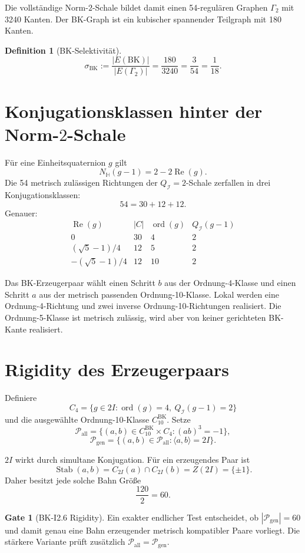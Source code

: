 \documentclass[11pt,a4paper]{article}
\theoremstyle{definition}
\newtheorem{definition}[theorem]{Definition}
\newtheorem{gate}[theorem]{Gate}
\theoremstyle{remark}
\newcommand{\BK}{\mathrm{BK}}
\newcommand{\QI}{Q_{\mathcal I}}
\newcommand{\HH}{\mathbb H}
\begin{document}
Die vollständige Norm-$2$-Schale bildet damit einen 54-regulären Graphen $\Gamma_2$ mit 3240 Kanten. Der BK-Graph ist ein kubischer spannender Teilgraph mit 180 Kanten.

\begin{definition}[BK-Selektivität]
\[
\sigma_{\BK}:=\frac{|E(\BK)|}{|E(\Gamma_2)|}
=\frac{180}{3240}
=\frac{3}{54}
=\boxed{\frac1{18}}.
\]
\end{definition}

\section{Konjugationsklassen hinter der Norm-$2$-Schale}
Für eine Einheitsquaternion $g$ gilt
\[
N_{\HH}(g-1)=2-2\operatorname{Re}(g).
\]
Die 54 metrisch zulässigen Richtungen der $\QI=2$-Schale zerfallen in drei Konjugationsklassen:
\[
54=30+12+12.
\]
Genauer:
\[
\begin{array}{c|c|c|c}
\operatorname{Re}(g)&|C|&\operatorname{ord}(g)&\QI(g-1)\\
\hline
0&30&4&2\\
(\sqrt5-1)/4&12&5&2\\
-(\sqrt5-1)/4&12&10&2
\end{array}
\]

Das BK-Erzeugerpaar wählt einen Schritt $b$ aus der Ordnung-4-Klasse und einen Schritt $a$ aus der metrisch passenden Ordnung-10-Klasse. Lokal werden eine Ordnung-4-Richtung und zwei inverse Ordnung-10-Richtungen realisiert. Die Ordnung-5-Klasse ist metrisch zulässig, wird aber von keiner gerichteten BK-Kante realisiert.

\section{Rigidity des Erzeugerpaars}
Definiere
\[
C_4=\{g\in2I:\operatorname{ord}(g)=4,\ \QI(g-1)=2\}
\]
und die ausgewählte Ordnung-10-Klasse $C_{10}^{\BK}$. Setze
\[
\mathcal P_{\mathrm{all}}
=
\{(a,b)\in C_{10}^{\BK}\times C_4:(ab)^3=-1\},
\]
\[
\mathcal P_{\mathrm{gen}}
=
\{(a,b)\in\mathcal P_{\mathrm{all}}:\langle a,b\rangle=2I\}.
\]

$2I$ wirkt durch simultane Konjugation. Für ein erzeugendes Paar ist
\[
\operatorname{Stab}(a,b)
=C_{2I}(a)\cap C_{2I}(b)
=Z(2I)=\{\pm1\}.
\]
Daher besitzt jede solche Bahn Größe
\[
\frac{120}{2}=60.
\]

\begin{gate}[BK-I2.6 Rigidity]
Ein exakter endlicher Test entscheidet, ob $|\mathcal P_{\mathrm{gen}}|=60$ und damit genau eine Bahn erzeugender metrisch kompatibler Paare vorliegt. Die stärkere Variante prüft zusätzlich $\mathcal P_{\mathrm{all}}=\mathcal P_{\mathrm{gen}}$.
\end{gate}
\end{document}
